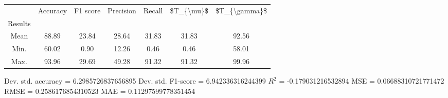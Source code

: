 \begin{tabular}{|c|c|c|c|c|c|c|}
\toprule
{} &  Accuracy &  F1 score &  Precision &  Recall &  \$T\_\{\textbackslash mu\}\$ &  \$T\_\{\textbackslash gamma\}\$ \\
Results &           &           &            &         &            &               \\
\hline
Mean    &     88.89 &     23.84 &      28.64 &   31.83 &      31.83 &         92.56 \\
Min.    &     60.02 &      0.90 &      12.26 &    0.46 &       0.46 &         58.01 \\
Max.    &     93.96 &     29.69 &      49.28 &   91.32 &      91.32 &         99.96 \\
\bottomrule
\end{tabular}

 Dev. std. accuracy = 6.2985726837656895
 Dev. std. F1-score = 6.942336316244399
 $R^2$ = -0.179031216532894
 MSE = 0.06688310721771472
 RMSE = 0.2586176854310523
 MAE = 0.11297599778351454